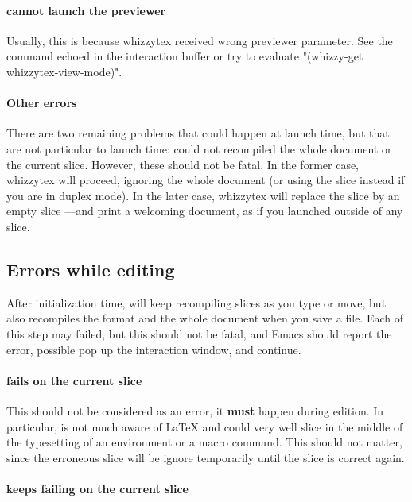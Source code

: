 \documentclass[12pt]{article}
\begin{document}
\paragraph {{\whizzy} cannot launch the previewer}

Usually, this is because whizzytex received wrong previewer parameter.  See
the command echoed in the interaction buffer or try to evaluate
\lst"(whizzy-get whizzytex-view-mode)".

\paragraph {Other errors}

There are two remaining problems that could happen at launch time, but that
are not particular to launch time: {\whizzy} could not recompiled the whole
document or the current slice. However, these should not be fatal.
In the former case, whizzytex will proceed, ignoring the whole document
(or using the slice instead if you are in duplex mode). In the later case,
whizzytex will replace the slice by an empty slice ---and print a welcoming
document, as if you launched {\whizzy} outside of any slice.

\subsection {Errors while editing}

After initialization time, {\whizzy} will keep recompiling slices as you
type or move, but also recompiles the format and the whole document when you
save a file. Each of this step may failed, but this should not be fatal, and
Emacs should report the error, possible pop up the interaction window, and
continue.

\paragraph {\whizzy\space fails on the current slice}

This should not be considered as an error, it {\bf must} happen during
edition. In particular, {\whizzy} is not much aware of {\LaTeX} and could
very well slice in the middle of the typesetting of an environment or a
macro command. This should not matter, since the erroneous slice will be
ignore temporarily until the slice is correct again.

\paragraph {\whizzy\space keeps failing on the current slice}
\end{document}
